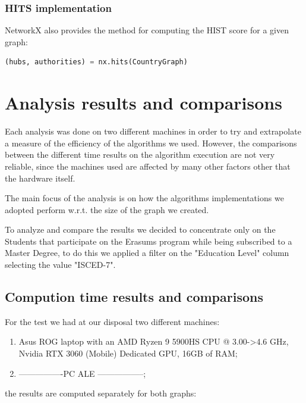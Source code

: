     \subsubsection*{HITS implementation}
    NetworkX also provides the method for computing the HIST score for a given graph:
    \begin{lstlisting}[language=python]
      (hubs, authorities) = nx.hits(CountryGraph)
    \end{lstlisting}

    \section{Analysis results and comparisons}
    Each analysis was done on two different machines in order to try and extrapolate a measure of the efficiency of the algorithms we used. 
    However, the comparisons between the different time results on the algorithm execution are not very reliable, since the machines used
    are affected by many other factors other that the hardware itself. 

    The main focus of the analysis is on how the algorithms implementations we adopted perform w.r.t. the size of the graph we created.

    To analyze and compare the results we decided to concentrate only on the Students that participate on the Erasums program while being
    subscribed to a Master Degree, to do this we applied a filter on the "Education Level" column selecting the value "ISCED-7".
    \subsection*{Compution time results and comparisons}
    For the test we had at our disposal two different machines:
    \begin{enumerate}
      \item Asus ROG laptop with an AMD Ryzen 9 5900HS CPU @ 3.00->4.6 GHz, Nvidia RTX 3060 (Mobile) Dedicated GPU, 16GB of RAM;
      \item ----------------PC ALE -----------------;
    \end{enumerate}
    the results are computed separately for both graphs:

